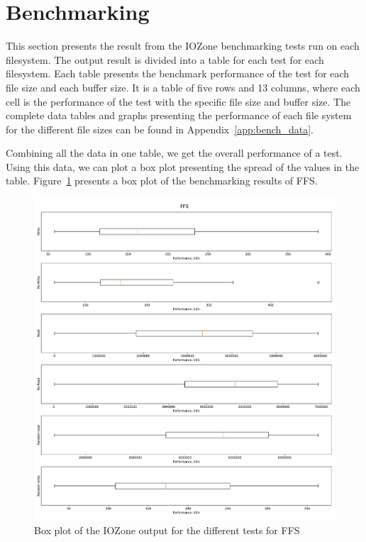 \section{Benchmarking}
\label{sec:res_bench}
This section presents the result from the IOZone benchmarking tests run on each filesystem. The output result is divided into a table for each test for each filesystem. Each table presents the benchmark performance of the test for each file size and each buffer size. It is a table of five rows and 13 columns, where each cell is the performance of the test with the specific file size and buffer size. The complete data tables and graphs presenting the performance of each file system for the different file sizes can be found in Appendix~\ref{app:bench_data}.

Combining all the data in one table, we get the overall performance of a test. Using this data, we can plot a box plot presenting the spread of the values in the table. Figure~\ref{fig:res_box_ffs} presents a box plot of the benchmarking results of FFS.

\begin{figure}[!htb]
	\label{fig:res_box_ffs}
	\begin{center}
		\includegraphics[width=1.0\textwidth]{figures/benchmarking/ffs/FFS-box.pdf}
	\end{center}
	\caption{Box plot of the IOZone output for the different tests for FFS}
\end{figure}

